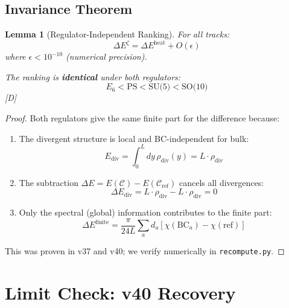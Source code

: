 \documentclass[11pt,a4paper]{article}
\newtheorem{lemma}[theorem]{Lemma}
\newcommand{\tagD}{\textcolor{blue!70!black}{[D]}}
\begin{document}
\subsection{Invariance Theorem}

\begin{lemma}[Regulator-Independent Ranking]
\label{lem:reg-inv}
For all tracks:
\begin{equation}
\label{eq:reg-inv-check}
\Delta E^{\zeta} = \Delta E^{\text{heat}} + O(\epsilon)
\end{equation}
where $\epsilon < 10^{-10}$ (numerical precision).

The ranking is \textbf{identical} under both regulators:
\begin{equation}
\label{eq:ranking-inv}
E_6 < \text{PS} < \text{SU(5)} < \text{SO(10)}
\end{equation}
\tagD
\end{lemma}

\begin{proof}
Both regulators give the same finite part for the difference because:
\begin{enumerate}
    \item The divergent structure is local and BC-independent for bulk:
    \begin{equation}
    \label{eq:div-structure}
    E_{\text{div}} = \int_0^L dy\, \rho_{\text{div}}(y) = L \cdot \rho_{\text{div}}
    \end{equation}
    \item The subtraction $\Delta E = E(\mathcal{C}) - E(\mathcal{C}_{\text{ref}})$ cancels all divergences:
    \begin{equation}
    \label{eq:div-cancel}
    \Delta E_{\text{div}} = L \cdot \rho_{\text{div}} - L \cdot \rho_{\text{div}} = 0
    \end{equation}
    \item Only the spectral (global) information contributes to the finite part:
    \begin{equation}
    \label{eq:spectral-finite}
    \Delta E^{\text{finite}} = \frac{\pi}{24L} \sum_a d_a [\chi(\text{BC}_a) - \chi(\text{ref})]
    \end{equation}
\end{enumerate}
This was proven in v37 and v40; we verify numerically in \texttt{recompute.py}.
\end{proof}

\section{Limit Check: v40 Recovery}
\end{document}
